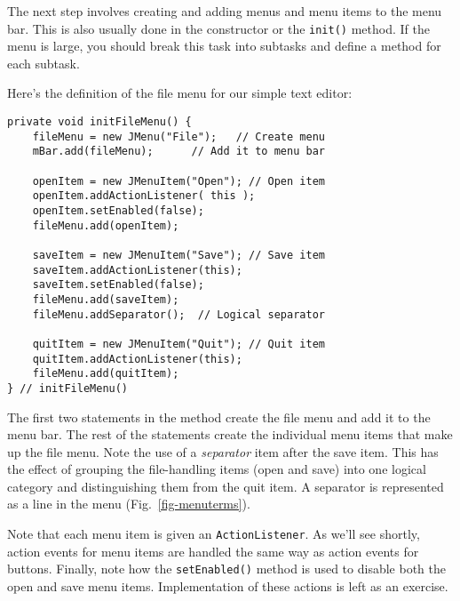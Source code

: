 \noindent The next step involves creating and adding menus and menu
items to the menu bar. This is also usually done in the constructor
or the {\tt init()} method. If the menu is large, you should break
this task into subtasks and define a method for each subtask.


\noindent Here's the definition of the file menu for our
simple text editor:

\begin{jjjlisting}
\begin{lstlisting}
private void initFileMenu() {
    fileMenu = new JMenu("File");   // Create menu
    mBar.add(fileMenu);      // Add it to menu bar

    openItem = new JMenuItem("Open"); // Open item
    openItem.addActionListener( this );
    openItem.setEnabled(false);
    fileMenu.add(openItem);

    saveItem = new JMenuItem("Save"); // Save item
    saveItem.addActionListener(this);
    saveItem.setEnabled(false);
    fileMenu.add(saveItem);
    fileMenu.addSeparator();  // Logical separator

    quitItem = new JMenuItem("Quit"); // Quit item
    quitItem.addActionListener(this);
    fileMenu.add(quitItem);
} // initFileMenu()
\end{lstlisting}
\end{jjjlisting}

\noindent The first two statements in the method create the file
menu and add it to the menu bar.  The rest of the statements create the
individual menu items that make up the file menu.  Note the use of a
{\it separator} item after the save item. This has the effect of
grouping the file-handling items (open and save) into one logical
category and distinguishing them from the quit item. A separator is
represented as a line in the menu (Fig.~\ref{fig-menuterms}).


\noindent Note that each menu item is given an {\tt ActionListener}.  As
we'll see shortly, action events for menu items are handled the same
way as action events for buttons. Finally, note how the
{\tt setEnabled()} method is used to disable both the open and save menu
items. Implementation of these actions is left as an exercise.

